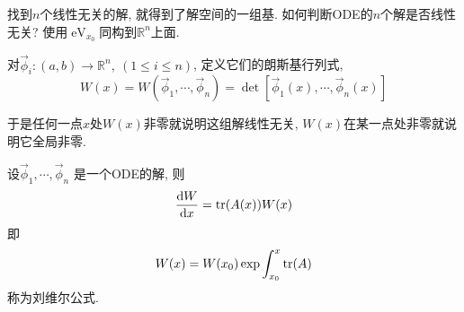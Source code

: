 找到$n$个线性无关的解, 就得到了解空间的一组基.
如何判断ODE的$n$个解是否线性无关? 使用$\operatorname{eV}_{x_0}$同构到$\mathbb{R}^{n}$上面.

\begin{definition}[Wronsky行列式]
  对$\vec{\phi}_{i}\colon (a,b) \to \mathbb{R}^{n},\ (1 \le i \le n)$, 定义它们的朗斯基行列式,
  \begin{equation}
    W(x) = W(\vec{\phi}_{1}, \cdots ,\vec{\phi}_n) = \det \left[ \vec{\phi}_{1}(x),\cdots ,\vec{\phi}_{n}(x) \right]
  \end{equation}
\end{definition}
于是任何一点$x$处$W(x)$非零就说明这组解线性无关, $W(x)$在某一点处非零就说明它全局非零.

\begin{proposition}
  设$\vec{\phi}_{1}, \cdots ,\vec{\phi}_n$ 是一个ODE的解, 则
  \begin{equation}
    \frac{\mathrm{d} W}{\mathrm{d} x} = \tr (A(x)) W(x)
  \end{equation}
  即
  \begin{equation}
    W(x) = W(x_0) \exp \int _{x_0}^{x} \tr(A)
  \end{equation}
  称为刘维尔公式.
\end{proposition}

